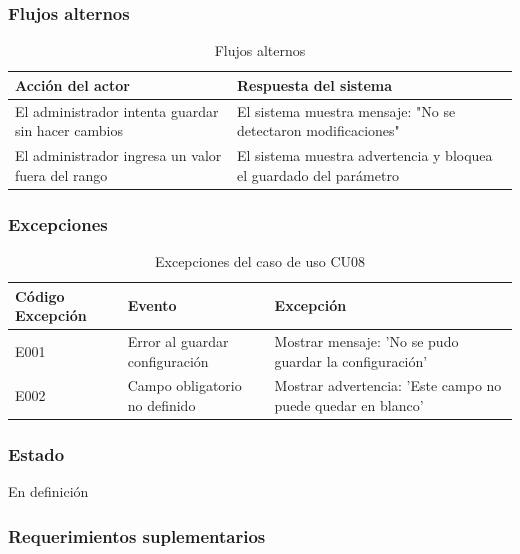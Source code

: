 \subsubsection*{Flujos alternos}
\begin{table}[h]
	\centering
	\caption{Flujos alternos}
	\begin{tabular}{|p{7cm}|p{7cm}|}
		\hline
		\textbf{Acción del actor}                          & \textbf{Respuesta del sistema}                                     \\ \hline
		El administrador intenta guardar sin hacer cambios & El sistema muestra mensaje: "No se detectaron modificaciones"      \\ \hline
		El administrador ingresa un valor fuera del rango  & El sistema muestra advertencia y bloquea el guardado del parámetro \\ \hline
	\end{tabular}
\end{table}

\subsubsection*{Excepciones}
\begin{table}[h]
	\centering
	\caption{Excepciones del caso de uso CU08}
	\begin{tabular}{|p{3cm}|p{5cm}|p{5cm}|}
		\hline
		\textbf{Código Excepción} & \textbf{Evento}                & \textbf{Excepción}                                          \\ \hline
		E001                      & Error al guardar configuración & Mostrar mensaje: 'No se pudo guardar la configuración'      \\ \hline
		E002                      & Campo obligatorio no definido  & Mostrar advertencia: 'Este campo no puede quedar en blanco' \\ \hline
	\end{tabular}
\end{table}

\newpage

\subsubsection*{Estado}
En definición


\subsubsection*{Requerimientos suplementarios}


